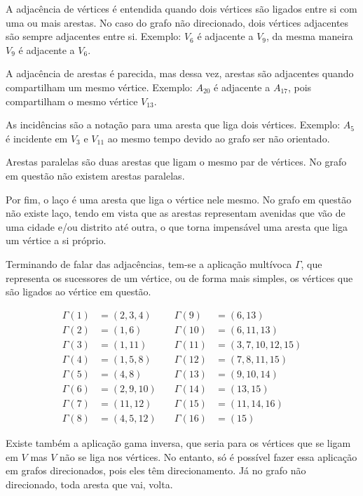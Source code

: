 	A adjacência de vértices é entendida quando dois vértices são ligados entre si com uma ou mais arestas.
	No caso do grafo não direcionado, dois vértices adjacentes são sempre adjacentes entre si.
	Exemplo: $V_6$ é adjacente a $V_9$, da mesma maneira $V_9$ é adjacente a $V_6$.
	
	A adjacência de arestas é parecida, mas dessa vez, arestas são adjacentes quando compartilham um mesmo vértice.
	Exemplo: $A_{20}$ é adjacente a $A_{17}$, pois compartilham o mesmo vértice $V_{13}$.
	
	As incidências são a notação para uma aresta que liga dois vértices.
	Exemplo: $A_{5}$ é incidente em $V_3$ e $V_{11}$ ao mesmo tempo devido ao grafo ser não orientado.
	
	Arestas paralelas são duas arestas que ligam o mesmo par de vértices.
	No grafo em questão não existem arestas paralelas.
	
	Por fim, o laço é uma aresta que liga o vértice nele mesmo.
	No grafo em questão não existe laço, tendo em vista que as arestas representam avenidas que vão de uma cidade e/ou distrito até outra, o que torna impensável uma aresta que liga um vértice a si próprio.
	
	Terminando de falar das adjacências, tem-se a aplicação multívoca $\Gamma$, que representa os sucessores de um vértice, ou de forma mais simples, os vértices que são ligados ao vértice em questão.
	
	\[
	\begin{alignedat}{2}
		\Gamma(1)  &= (2,3,4)      &\quad \Gamma(9)  &= (6,13) \\
		\Gamma(2)  &= (1,6)        &\quad \Gamma(10) &= (6,11,13) \\
		\Gamma(3)  &= (1,11)       &\quad \Gamma(11) &= (3,7,10,12,15) \\
		\Gamma(4)  &= (1,5,8)      &\quad \Gamma(12) &= (7,8,11,15) \\
		\Gamma(5)  &= (4,8)        &\quad \Gamma(13) &= (9,10,14) \\
		\Gamma(6)  &= (2,9,10)     &\quad \Gamma(14) &= (13,15) \\
		\Gamma(7)  &= (11,12)      &\quad \Gamma(15) &= (11,14,16) \\
		\Gamma(8)  &= (4,5,12)     &\quad \Gamma(16) &= (15)
	\end{alignedat}
	\]
	
	Existe também a aplicação gama inversa, que seria para os vértices que se ligam em $V$ mas $V$ não se liga nos vértices.
	No entanto, só é possível fazer essa aplicação em grafos direcionados, pois eles têm direcionamento.
	Já no grafo não direcionado, toda aresta que vai, volta.
	
